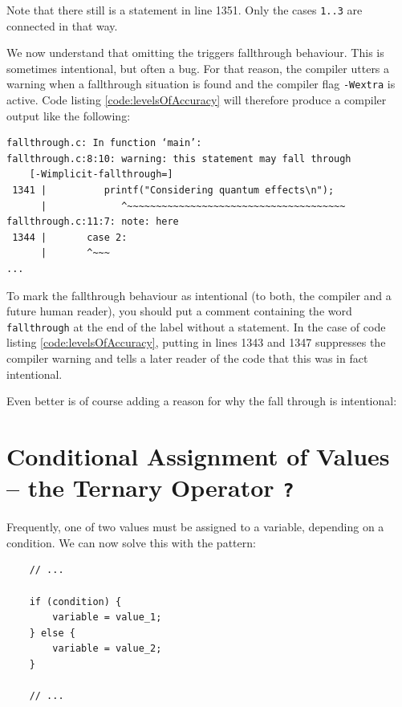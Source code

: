 Note that there still is a  statement in line 1351. Only the cases \texttt{1..3} are connected in that way.

\begin{hintbox}
We now understand that omitting the  triggers fallthrough behaviour. This is sometimes intentional, but often a bug. For that reason, the compiler utters a warning when a fallthrough situation is found and the compiler flag \texttt{-Wextra} is active. Code listing \ref{code:levelsOfAccuracy} will therefore produce a compiler output like the following:

\vspace{6pt}
\begin{cmdbox}
\begin{verbatim}
fallthrough.c: In function ‘main’:
fallthrough.c:8:10: warning: this statement may fall through 
    [-Wimplicit-fallthrough=]
 1341 |          printf("Considering quantum effects\n");
      |             ^~~~~~~~~~~~~~~~~~~~~~~~~~~~~~~~~~~~~~~
fallthrough.c:11:7: note: here
 1344 |       case 2:
      |       ^~~~
...
\end{verbatim}
\end{cmdbox}

To mark the fallthrough behaviour as intentional (to both, the compiler and a future human reader), you should put a comment containing the word \texttt{fallthrough} at the end of the  label without a  statement. In the case of code listing \ref{code:levelsOfAccuracy}, putting  in lines 1343 and 1347 suppresses the compiler warning and tells a later reader of the code that this was in fact intentional.

Even better is of course adding a reason for why the fall through is intentional:\\
\end{hintbox}

\section{Conditional Assignment of Values -- the Ternary Operator \texttt{?}}
Frequently, one of two values must be assigned to a variable, depending on a condition. We can now solve this with the pattern:
\begin{codebox}[conditionalAssignmentIf.c]
\begin{verbatim}
    // ...
   
    if (condition) {
        variable = value_1;
    } else {
        variable = value_2;
    }
    
    // ...
\end{verbatim}
\end{codebox}

